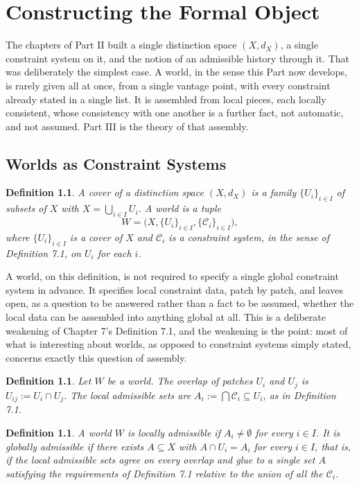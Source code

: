 \documentclass[11pt]{book}
\newtheorem{definition}[theorem]{Definition}
\begin{document}
\part{Constructing the Formal Object}

The chapters of Part II built a single distinction space $(X, d_X)$, a single constraint system on it, and the notion of an admissible history through it. That was deliberately the simplest case. A world, in the sense this Part now develops, is rarely given all at once, from a single vantage point, with every constraint already stated in a single list. It is assembled from local pieces, each locally consistent, whose consistency with one another is a further fact, not automatic, and not assumed. Part III is the theory of that assembly.

\chapter{Worlds as Constraint Systems}

\begin{definition}
A \emph{cover} of a distinction space $(X, d_X)$ is a family $\{U_i\}_{i \in I}$ of subsets of $X$ with $X = \bigcup_{i \in I} U_i$. A \emph{world} is a tuple
\[
W = \big( X, \{U_i\}_{i \in I}, \{\mathcal C_i\}_{i \in I} \big),
\]
where $\{U_i\}_{i \in I}$ is a cover of $X$ and $\mathcal C_i$ is a constraint system, in the sense of Definition 7.1, on $U_i$ for each $i$.
\end{definition}

A world, on this definition, is not required to specify a single global constraint system in advance. It specifies local constraint data, patch by patch, and leaves open, as a question to be answered rather than a fact to be assumed, whether the local data can be assembled into anything global at all. This is a deliberate weakening of Chapter 7's Definition 7.1, and the weakening is the point: most of what is interesting about worlds, as opposed to constraint systems simply stated, concerns exactly this question of assembly.

\begin{definition}
Let $W$ be a world. The \emph{overlap} of patches $U_i$ and $U_j$ is $U_{ij} := U_i \cap U_j$. The local admissible sets are $A_i := \bigcap \mathcal C_i \subseteq U_i$, as in Definition 7.1.
\end{definition}

\begin{definition}
A world $W$ is \emph{locally admissible} if $A_i \neq \emptyset$ for every $i \in I$. It is \emph{globally admissible} if there exists $A \subseteq X$ with $A \cap U_i = A_i$ for every $i \in I$, that is, if the local admissible sets agree on every overlap and glue to a single set $A$ satisfying the requirements of Definition 7.1 relative to the union of all the $\mathcal C_i$.
\end{definition}
\end{document}
